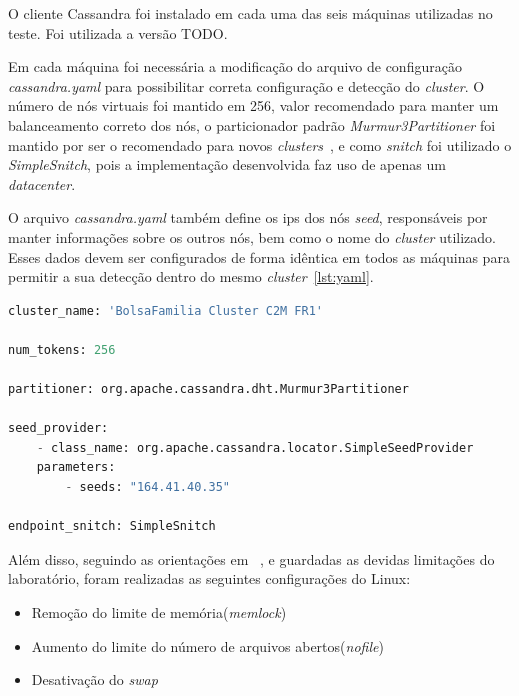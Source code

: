 O cliente Cassandra foi instalado em cada uma das seis máquinas utilizadas no teste. Foi utilizada a versão TODO.

Em cada máquina foi necessária a modificação do arquivo de configuração \emph{cassandra.yaml} para possibilitar correta configuração e detecção do \emph{cluster}. O número de nós virtuais foi mantido em 256, valor recomendado para manter um balanceamento correto dos nós, o particionador padrão \emph{Murmur3Partitioner} foi mantido por ser o recomendado para novos \emph{clusters}~\cite{cassandrapartitioners}, e como \emph{snitch} foi utilizado o \emph{SimpleSnitch}, pois a implementação desenvolvida faz uso de apenas um \emph{datacenter}. 

O arquivo \emph{cassandra.yaml} também define os ips dos nós \emph{seed}, responsáveis por manter informações sobre os outros nós, bem como o nome do \emph{cluster} utilizado. Esses dados devem ser configurados de forma idêntica em todos as máquinas para permitir a sua detecção dentro do mesmo \emph{cluster}~\ref{lst:yaml}.

\begin{lstlisting}[caption={Configuração cassandra.yaml},label={lst:yaml},language=python]
cluster_name: 'BolsaFamilia Cluster C2M FR1'

num_tokens: 256

partitioner: org.apache.cassandra.dht.Murmur3Partitioner

seed_provider:
	- class_name: org.apache.cassandra.locator.SimpleSeedProvider
	parameters:
		- seeds: "164.41.40.35"

endpoint_snitch: SimpleSnitch

\end{lstlisting}

Além disso, seguindo as orientações em ~\cite{cassandrasettings}, e guardadas as devidas limitações do laboratório, foram realizadas as seguintes configurações do Linux:
\begin{itemize}
	\item Remoção do limite de memória(\emph{memlock})
	\item Aumento do limite do número de arquivos abertos(\emph{nofile})
	\item Desativação do \emph{swap}
\end{itemize}




